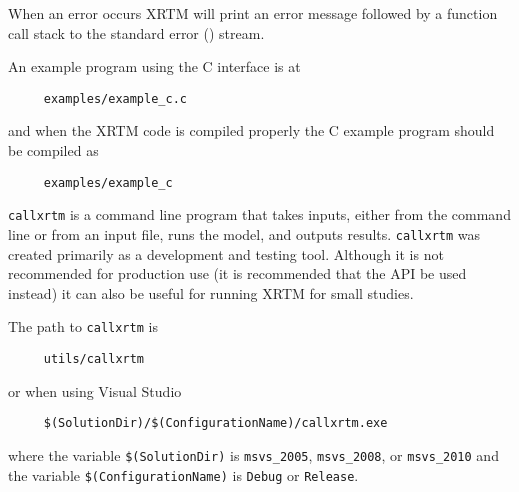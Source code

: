 \noindent
When an error occurs XRTM will print an error message followed by a function call stack to the standard error () stream.


%
\label{xrtm_c_interface_example_c_program_using_xrtm}

An example program using the C interface is at
\begin{verbatim}
     examples/example_c.c
\end{verbatim}
and when the XRTM code is compiled properly the C example program should be compiled as
\begin{verbatim}
     examples/example_c
\end{verbatim}



%
\label{xrtm_utilities}


%
\label{xrtm_utilities_test_suite_testxrtms}

\label{xrtm_utilities_stand_alone_execution_callxrtm_testxrtm_options}


%
\label{xrtm_utilities_stand_alone_execution_callxrtm}

\texttt{callxrtm} is a command line program  that takes inputs, either from the command line or from an input file, runs the model, and outputs results.  \texttt{callxrtm} was created primarily as a development and testing tool.  Although it is not recommended for production use (it is recommended that the API be used instead) it can also be useful for running XRTM for small studies.

\noindent
The path to \texttt{callxrtm} is 
\begin{verbatim}
     utils/callxrtm
\end{verbatim}
or when using Visual Studio
\begin{verbatim}
     $(SolutionDir)/$(ConfigurationName)/callxrtm.exe
\end{verbatim}
where the variable \texttt{\$(SolutionDir)} is \texttt{msvs\_2005}, \texttt{msvs\_2008}, or \texttt{msvs\_2010} and the variable \texttt{\$(ConfigurationName)} is \texttt{Debug} or \texttt{Release}.

